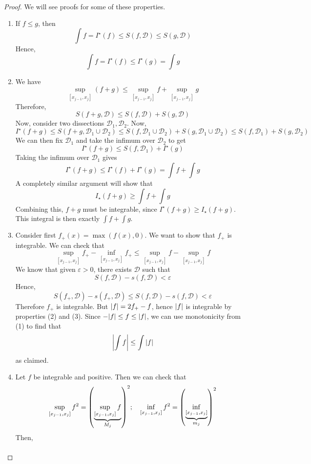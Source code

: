 \documentclass{article}
\begin{document}
\begin{proof}
	We will see proofs for some of these properties.
	\begin{enumerate}[(1)]
		\item If $f \leq g$, then
		      \[ \int f = I^\star(f) \leq S(f, \mathcal D) \leq S(g, \mathcal D) \]
		      Hence,
		      \[ \int f = I^\star(f) \leq I^\star(g) = \int g \]
		\item We have
		      \[ \sup_{[x_{j-1}, x_j]} (f + g) \leq \sup_{[x_{j-1}, x_j]} f + \sup_{[x_{j-1}, x_j]} g \]
		      Therefore,
		      \[ S(f + g, \mathcal D) \leq S(f, \mathcal D) + S(g, \mathcal D) \]
		      Now, consider two dissections $\mathcal D_1, \mathcal D_2$. Now,
		      \[ I^\star(f + g) \leq S(f + g, \mathcal D_1 \cup \mathcal D_2) \leq S(f, \mathcal D_1 \cup \mathcal D_2) + S(g, \mathcal D_1 \cup \mathcal D_2) \leq S(f, \mathcal D_1) + S(g, \mathcal D_2) \]
		      We can then fix $\mathcal D_1$ and take the infimum over $\mathcal D_2$ to get
		      \[ I^\star(f + g) \leq S(f, \mathcal D_1) + I^\star(g) \]
		      Taking the infimum over $\mathcal D_1$ gives
		      \[ I^\star(f + g) \leq I^\star(f) + I^\star(g) = \int f + \int g \]
		      A completely similar argument will show that
		      \[ I_\star(f + g) \geq \int f + \int g \]
		      Combining this, $f+g$ must be integrable, since $I^\star(f + g) \geq I_\star(f + g)$. This integral is then exactly $\int f + \int g$.
		      \setcounter{enumi}{3}
		\item Consider first $f_+(x) = \max(f(x), 0)$. We want to show that $f_+$ is integrable. We can check that
		      \[ \sup_{[x_{j-1}, x_j]}f_+ - \inf_{[x_{j-1}, x_j]}f_+ \leq \sup_{[x_{j-1}, x_j]}f - \sup_{[x_{j-1}, x_j]}f \]
		      We know that given $\varepsilon > 0$, there exists $\mathcal D$ such that
		      \[ S(f, \mathcal D) - s(f, \mathcal D) < \varepsilon \]
		      Hence,
		      \[ S(f_+, \mathcal D) - s(f_+, \mathcal D) \leq S(f, \mathcal D) - s(f, \mathcal D) < \varepsilon \]
		      Therefore $f_+$ is integrable. But $\abs{f} = 2f_+ - f$, hence $\abs{f}$ is integrable by properties (2) and (3). Since $-\abs{f} \leq f \leq \abs{f}$, we can use monotonicity from (1) to find that
		      \[ \abs{\int f} \leq \int \abs{f} \]
		      as claimed.
		\item Let $f$ be integrable and positive. Then we can check that
		      \[ \sup_{[x_{j-1}, x_j]} f^2 = \qty(\underbrace{\sup_{[x_{j-1}, x_j]} f}_{M_j})^2;\quad \inf_{[x_{j-1}, x_j]} f^2 = \qty(\underbrace{\inf_{[x_{j-1}, x_j]}}_{m_j})^2 \]
		      Then,
		      \begin{align*}

\end{align*}
\end{enumerate}
\end{proof}
\end{document}
